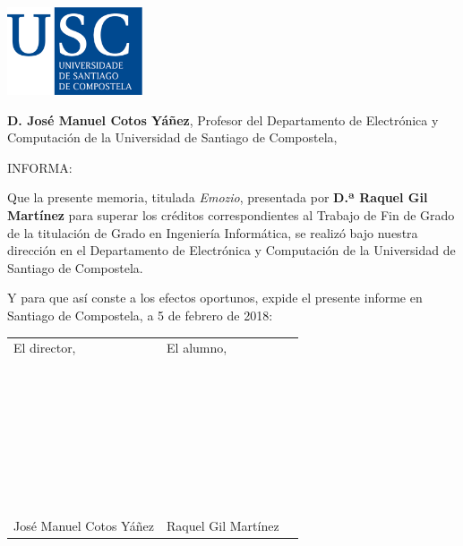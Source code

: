 \pagestyle{plain}
\includegraphics[width=4cm]{figuras/logo_usc.eps}

\vspace{1cm}
{\bf D. José Manuel Cotos Yáñez}, Profesor del Departamento de Electrónica y Computación de la Universidad de Santiago de Compostela,

\vspace{1cm}
INFORMA:

\vspace{1cm}
Que la presente memoria, titulada {\it Emozio}, presentada por {\bf D.ª Raquel Gil Martínez} para superar los créditos correspondientes al Trabajo de Fin de Grado de la titulación de Grado en Ingeniería Informática, se realizó bajo nuestra dirección en el Departamento de Electrónica y Computación de la Universidad de Santiago de Compostela.

\vspace{1cm}
Y para que así conste a los efectos oportunos, expide el presente informe en Santiago de Compostela, a 5 de febrero de 2018:

\vspace{2cm}
\begin{tabular}{lll}
El director, & El alumno, \\
~ \\
~ \\
~ \\
~ \\
~ \\
~ \\
~ \\
José Manuel Cotos Yáñez & Raquel Gil Martínez
\end{tabular}

